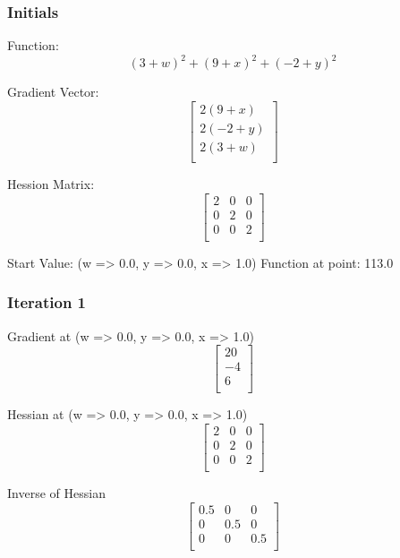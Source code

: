 \documentclass{article}
\begin{document}
\subsubsection{Initials}
Function:
\begin{equation}
\left( 3 + w \right)^{2} + \left( 9 + x \right)^{2} + \left( -2 + y \right)^{2}
\end{equation}

Gradient Vector:
\begin{equation}
\left[
\begin{array}{c}
2 \left( 9 + x \right) \\
2 \left( -2 + y \right) \\
2 \left( 3 + w \right) \\
\end{array}
\right]
\end{equation}

Hession Matrix:
\begin{equation}
\left[
\begin{array}{ccc}
2 & 0 & 0 \\
0 & 2 & 0 \\
0 & 0 & 2 \\
\end{array}
\right]
\end{equation}

Start Value:
(w => 0.0, y => 0.0, x => 1.0)
Function at point:
113.0
\subsubsection{Iteration 1}
Gradient at (w => 0.0, y => 0.0, x => 1.0)
\begin{equation}
\left[
\begin{array}{c}
20 \\
-4 \\
6 \\
\end{array}
\right]
\end{equation}

Hessian at (w => 0.0, y => 0.0, x => 1.0)
\begin{equation}
\left[
\begin{array}{ccc}
2 & 0 & 0 \\
0 & 2 & 0 \\
0 & 0 & 2 \\
\end{array}
\right]
\end{equation}

Inverse of Hessian
\begin{equation}
\left[
\begin{array}{ccc}
0.5 & 0 & 0 \\
0 & 0.5 & 0 \\
0 & 0 & 0.5 \\
\end{array}
\right]
\end{equation}
\end{document}
